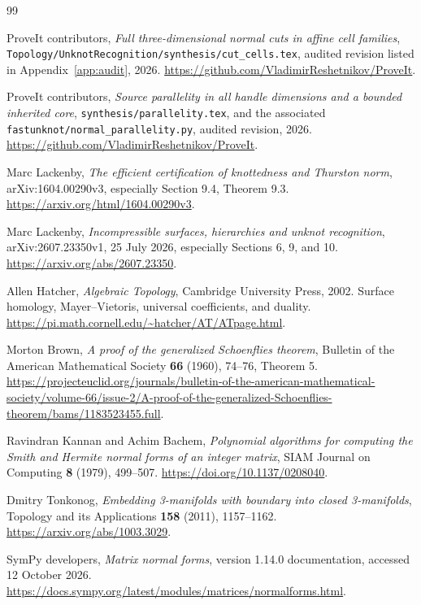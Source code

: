\documentclass[11pt]{article}
\theoremstyle{definition}
\theoremstyle{remark}
\newcommand{\code}[1]{\texttt{#1}}
\begin{document}
\begin{thebibliography}{99}
\raggedright
{}
ProveIt contributors, \emph{Full three-dimensional normal cuts in affine cell
families}, \code{Topology/UnknotRecognition/synthesis/cut\_cells.tex}, audited
revision listed in Appendix~\ref{app:audit}, 2026.
\url{https://github.com/VladimirReshetnikov/ProveIt}.

ProveIt contributors, \emph{Source parallelity in all handle dimensions and a
bounded inherited core}, \code{synthesis/parallelity.tex}, and the associated
\code{fastunknot/normal\_parallelity.py}, audited revision, 2026.
\url{https://github.com/VladimirReshetnikov/ProveIt}.

Marc Lackenby, \emph{The efficient certification of knottedness and Thurston
norm}, arXiv:1604.00290v3, especially Section 9.4, Theorem 9.3.
\url{https://arxiv.org/html/1604.00290v3}.

Marc Lackenby, \emph{Incompressible surfaces, hierarchies and unknot
recognition}, arXiv:2607.23350v1, 25 July 2026, especially Sections 6, 9,
and 10. \url{https://arxiv.org/abs/2607.23350}.

Allen Hatcher, \emph{Algebraic Topology}, Cambridge University Press, 2002.
Surface homology, Mayer--Vietoris, universal coefficients, and duality.
\url{https://pi.math.cornell.edu/~hatcher/AT/ATpage.html}.

Morton Brown, \emph{A proof of the generalized Schoenflies theorem},
Bulletin of the American Mathematical Society \textbf{66} (1960), 74--76,
Theorem 5.
\url{https://projecteuclid.org/journals/bulletin-of-the-american-mathematical-society/volume-66/issue-2/A-proof-of-the-generalized-Schoenflies-theorem/bams/1183523455.full}.

Ravindran Kannan and Achim Bachem, \emph{Polynomial algorithms for computing
the Smith and Hermite normal forms of an integer matrix}, SIAM Journal on
Computing \textbf{8} (1979), 499--507.
\url{https://doi.org/10.1137/0208040}.

Dmitry Tonkonog, \emph{Embedding 3-manifolds with boundary into closed
3-manifolds}, Topology and its Applications \textbf{158} (2011), 1157--1162.
\url{https://arxiv.org/abs/1003.3029}.

SymPy developers, \emph{Matrix normal forms}, version 1.14.0 documentation,
accessed 12 October 2026.
\url{https://docs.sympy.org/latest/modules/matrices/normalforms.html}.
\end{thebibliography}
\end{document}
